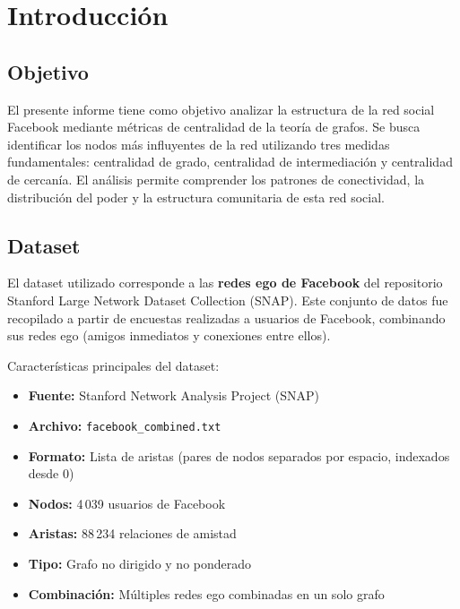 \documentclass[12pt,a4paper,oneside,openany]{book}
\begin{document}
\tableofcontents
\clearpage

\chapter{Introducción}

\section{Objetivo}

\begin{infobox}
El presente informe tiene como objetivo analizar la estructura de la red social Facebook
mediante métricas de centralidad de la teoría de grafos. Se busca identificar los nodos
más influyentes de la red utilizando tres medidas fundamentales: centralidad de grado,
centralidad de intermediación y centralidad de cercanía. El análisis permite comprender
los patrones de conectividad, la distribución del poder y la estructura comunitaria
de esta red social.
\end{infobox}

\section{Dataset}

El dataset utilizado corresponde a las \textbf{redes ego de Facebook} del repositorio
Stanford Large Network Dataset Collection (SNAP). Este conjunto de datos fue recopilado
a partir de encuestas realizadas a usuarios de Facebook, combinando sus redes ego
(amigos inmediatos y conexiones entre ellos).

Características principales del dataset:
\begin{itemize}[leftmargin=1.5cm]
  \item \textbf{Fuente:} Stanford Network Analysis Project (SNAP)
  \item \textbf{Archivo:} \nolinkurl{facebook_combined.txt}
  \item \textbf{Formato:} Lista de aristas (pares de nodos separados por espacio, indexados desde 0)
  \item \textbf{Nodos:} 4\,039 usuarios de Facebook
  \item \textbf{Aristas:} 88\,234 relaciones de amistad
  \item \textbf{Tipo:} Grafo no dirigido y no ponderado
  \item \textbf{Combinación:} Múltiples redes ego combinadas en un solo grafo
\end{itemize}
\end{document}
